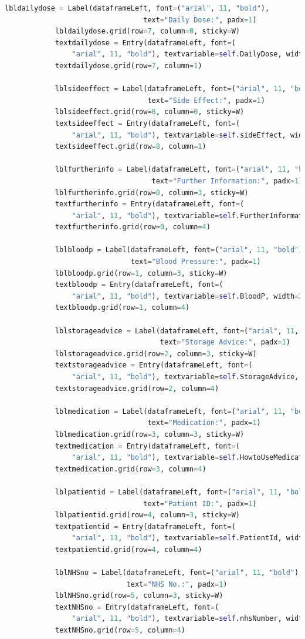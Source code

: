 \documentclass{article}
\begin{document}
\begin{lstlisting}[language=Python, caption=Hospital Management.py]
			lbldailydose = Label(dataframeLeft, font=("arial", 11, "bold"),
								 text="Daily Dose:", padx=1)
			lbldailydose.grid(row=7, column=0, sticky=W)
			textdailydose = Entry(dataframeLeft, font=(
				"arial", 11, "bold"), textvariable=self.DailyDose, width=33)
			textdailydose.grid(row=7, column=1)
	
			lblsideeffect = Label(dataframeLeft, font=("arial", 11, "bold"),
								  text="Side Effect:", padx=1)
			lblsideeffect.grid(row=8, column=0, sticky=W)
			textsideeffect = Entry(dataframeLeft, font=(
				"arial", 11, "bold"), textvariable=self.sideEffect, width=33)
			textsideeffect.grid(row=8, column=1)
	
			lblfurtherinfo = Label(dataframeLeft, font=("arial", 11, "bold"),
								   text="Further Information:", padx=1)
			lblfurtherinfo.grid(row=0, column=3, sticky=W)
			textfurtherinfo = Entry(dataframeLeft, font=(
				"arial", 11, "bold"), textvariable=self.FurtherInformation, width=25)
			textfurtherinfo.grid(row=0, column=4)
	
			lblbloodp = Label(dataframeLeft, font=("arial", 11, "bold"),
							  text="Blood Pressure:", padx=1)
			lblbloodp.grid(row=1, column=3, sticky=W)
			textbloodp = Entry(dataframeLeft, font=(
				"arial", 11, "bold"), textvariable=self.BloodP, width=25)
			textbloodp.grid(row=1, column=4)
	
			lblstorageadvice = Label(dataframeLeft, font=("arial", 11, "bold"),
									 text="Storage Advice:", padx=1)
			lblstorageadvice.grid(row=2, column=3, sticky=W)
			textstorageadvice = Entry(dataframeLeft, font=(
				"arial", 11, "bold"), textvariable=self.StorageAdvice, width=25)
			textstorageadvice.grid(row=2, column=4)
	
			lblmedication = Label(dataframeLeft, font=("arial", 11, "bold"),
								  text="Medication:", padx=1)
			lblmedication.grid(row=3, column=3, sticky=W)
			textmedication = Entry(dataframeLeft, font=(
				"arial", 11, "bold"), textvariable=self.HowtoUseMedications, width=25)
			textmedication.grid(row=3, column=4)
	
			lblpatientid = Label(dataframeLeft, font=("arial", 11, "bold"),
								 text="Patient ID:", padx=1)
			lblpatientid.grid(row=4, column=3, sticky=W)
			textpatientid = Entry(dataframeLeft, font=(
				"arial", 11, "bold"), textvariable=self.PatientId, width=25)
			textpatientid.grid(row=4, column=4)
	
			lblNHSno = Label(dataframeLeft, font=("arial", 11, "bold"),
							 text="NHS No.:", padx=1)
			lblNHSno.grid(row=5, column=3, sticky=W)
			textNHSno = Entry(dataframeLeft, font=(
				"arial", 11, "bold"), textvariable=self.nhsNumber, width=25)
			textNHSno.grid(row=5, column=4)
	

\end{lstlisting}
\end{document}
